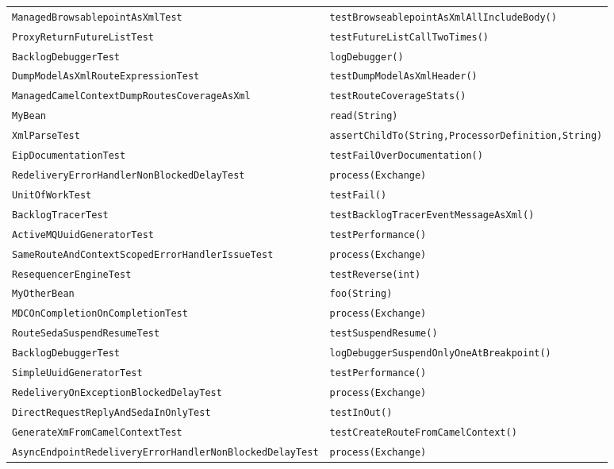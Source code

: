\begin{center}
\begin{longtable}{ll}
\lstinline/ManagedBrowsablepointAsXmlTest/&{\lstinline/testBrowseablepointAsXmlAllIncludeBody()/}\\
\lstinline/ProxyReturnFutureListTest/&{\lstinline/testFutureListCallTwoTimes()/}\\
\lstinline/BacklogDebuggerTest/&{\lstinline/logDebugger()/}\\
\lstinline/DumpModelAsXmlRouteExpressionTest/&{\lstinline/testDumpModelAsXmlHeader()/}\\
\lstinline/ManagedCamelContextDumpRoutesCoverageAsXml/&{\lstinline/testRouteCoverageStats()/}\\
\lstinline/MyBean/&{\lstinline/read(String)/}\\
\lstinline/XmlParseTest/&{\lstinline/assertChildTo(String,ProcessorDefinition,String)/}\\
\lstinline/EipDocumentationTest/&{\lstinline/testFailOverDocumentation()/}\\
\lstinline/RedeliveryErrorHandlerNonBlockedDelayTest/&{\lstinline/process(Exchange)/}\\
\lstinline/UnitOfWorkTest/&{\lstinline/testFail()/}\\
\lstinline/BacklogTracerTest/&{\lstinline/testBacklogTracerEventMessageAsXml()/}\\
\lstinline/ActiveMQUuidGeneratorTest/&{\lstinline/testPerformance()/}\\
\lstinline/SameRouteAndContextScopedErrorHandlerIssueTest/&{\lstinline/process(Exchange)/}\\
\lstinline/ResequencerEngineTest/&{\lstinline/testReverse(int)/}\\
\lstinline/MyOtherBean/&{\lstinline/foo(String)/}\\
\lstinline/MDCOnCompletionOnCompletionTest/&{\lstinline/process(Exchange)/}\\
\lstinline/RouteSedaSuspendResumeTest/&{\lstinline/testSuspendResume()/}\\
\lstinline/BacklogDebuggerTest/&{\lstinline/logDebuggerSuspendOnlyOneAtBreakpoint()/}\\
\lstinline/SimpleUuidGeneratorTest/&{\lstinline/testPerformance()/}\\
\lstinline/RedeliveryOnExceptionBlockedDelayTest/&{\lstinline/process(Exchange)/}\\
\lstinline/DirectRequestReplyAndSedaInOnlyTest/&{\lstinline/testInOut()/}\\
\lstinline/GenerateXmFromCamelContextTest/&{\lstinline/testCreateRouteFromCamelContext()/}\\
\lstinline/AsyncEndpointRedeliveryErrorHandlerNonBlockedDelayTest/&{\lstinline/process(Exchange)/}\\

\end{longtable}
\end{center}
